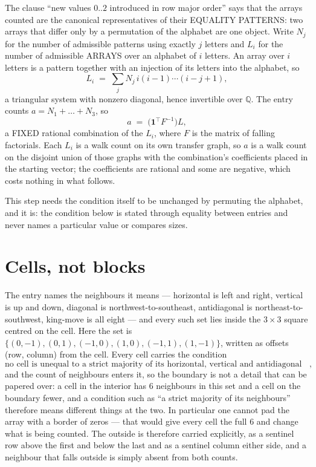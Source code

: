 \documentclass[11pt,a4paper]{article}
\theoremstyle{plain}
\theoremstyle{definition}
\begin{document}
The clause ``new values $0..2$ introduced in row major order'' says that the arrays
counted are the canonical representatives of their EQUALITY PATTERNS: two arrays that differ
only by a permutation of the alphabet are one object. Write $N_j$ for the number of admissible
patterns using exactly $j$ letters and $L_i$ for the number of admissible ARRAYS over an
alphabet of $i$ letters. An array over $i$ letters is a pattern together with an injection of
its letters into the alphabet, so
\[
L_i\;=\;\sum_{j}N_j\,i(i-1)\cdots(i-j+1),
\]
a triangular system with nonzero diagonal, hence invertible over $\mathbb{Q}$. The entry
counts $a=N_1+\dots+N_{3}$, so
\[
a\;=\;\bigl(\mathbf{1}^{\!\top}F^{-1}\bigr)L ,
\]
a FIXED rational combination of the $L_i$, where $F$ is the matrix of falling factorials.
Each $L_i$ is a walk count on its own transfer graph, so $a$ is a walk count on the disjoint
union of those graphs with the combination's coefficients placed in the starting vector; the
coefficients are rational and some are negative, which costs nothing in what follows.

This step needs the condition itself to be unchanged by permuting the alphabet, and it is:
the condition below is stated through equality between entries and never names a particular
value or compares sizes.

\section{Cells, not blocks}

The entry names the neighbours it means --- horizontal is left and right, vertical is up and
down, diagonal is northwest-to-southeast, antidiagonal is northeast-to-southwest, king-move is
all eight --- and every such set lies inside the $3\times3$ square centred on the cell. Here
the set is $\{(0,-1), (0,1), (-1,0), (1,0), (-1,1), (1,-1)\}$, written as offsets (row, column) from the cell. Every cell carries
the condition
\[
\text{no cell is unequal to a strict majority of its horizontal, vertical and antidiagonal neighbours},
\]
and the count of neighbours enters it, so the boundary is not a detail that can be papered
over: a cell in the interior has $6$ neighbours in this set and a cell on the boundary
fewer, and a condition such as ``a strict majority of its neighbours'' therefore means
different things at the two. In particular one cannot pad the array with a border of zeros ---
that would give every cell the full $6$ and change what is being counted. The outside is
therefore carried
explicitly, as a sentinel row above the first and below the last and as a sentinel column
either side, and a neighbour that falls outside is simply absent from both counts.
\end{document}
